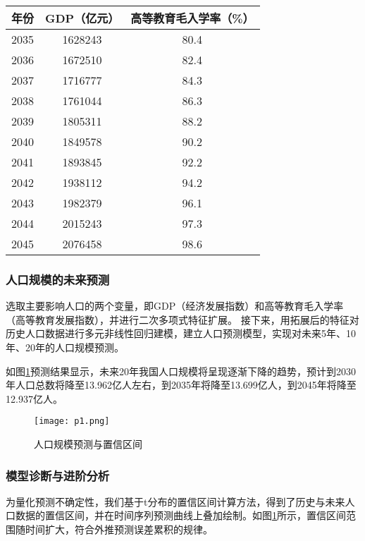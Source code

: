 \documentclass[withoutpreface,bwprint]{cumcmthesis} %
\begin{document}
\begin{table}[H]
\begin{minipage}{0.48\textwidth}
        \begin{tabular}{|c|c|c|}
        \hline
        年份   & GDP（亿元） & 高等教育毛入学率（\%） \\ 
        \hline
        2035 & 1628243    & 80.4         \\ 
        \hline
        2036 & 1672510    & 82.4         \\ 
        \hline
        2037 & 1716777    & 84.3         \\ 
        \hline
        2038 & 1761044    & 86.3         \\ 
        \hline
        2039 & 1805311    & 88.2         \\ 
        \hline
        2040 & 1849578    & 90.2         \\ 
        \hline
        2041 & 1893845    & 92.2         \\ 
        \hline
        2042 & 1938112    & 94.2         \\ 
        \hline
        2043 & 1982379    & 96.1         \\ 
        \hline
        2044 & 2015243    & 97.3         \\ 
        \hline
        2045 & 2076458    & 98.6         \\ 
        \hline
        \end{tabular}
    \end{minipage}
\end{table}
\subsubsection{人口规模的未来预测}

选取主要影响人口的两个变量，即GDP（经济发展指数）和高等教育毛入学率（高等教育发展指数），并进行二次多项式特征扩展。
接下来，用拓展后的特征对历史人口数据进行多元非线性回归建模，建立人口预测模型，实现对未来5年、10年、20年的人口规模预测。

如图\ref{quetion1.1}预测结果显示，未来20年我国人口规模将呈现逐渐下降的趋势，预计到2030年人口总数将降至13.962亿人左右，到2035年将降至13.699亿人，到2045年将降至12.937亿人。

\begin{figure}[H]
    \centering
    \caption{人口规模预测与置信区间}
    \texttt{[image: p1.png]} %
	\label{quetion1.1} %
\end{figure}

\subsubsection{模型诊断与进阶分析}
为量化预测不确定性，我们基于t分布的置信区间计算方法，得到了历史与未来人口数据的置信区间，并在时间序列预测曲线上叠加绘制。如图\ref{quetion1.1}所示，置信区间范围随时间扩大，符合外推预测误差累积的规律。
\end{document}
